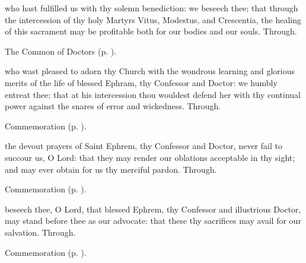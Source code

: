 
\postcommunion
{} who hast fulfilled us with thy solemn benediction: we beseech thee; that through the intercession of thy holy Martyrs Vitus, Modestus, and Crescentia, the healing of this sacrament may be profitable both for our bodies and our souls. Through.



\begin{rubric}
	The Common of Doctors (p. \pageref{CommonDoctors}).
\end{rubric}

\collect
{} who wast pleased to adorn thy Church with the wondrous learning and glorious merits of the life of blessed Ephram, thy Confessor and Doctor: we humbly entreat thee; that at his intercession thou wouldest defend her with thy continual power against the snares of error and wickedness. Through.

\begin{rubric}
	Commemoration  (p. \pageref{MarcusMarcellianusCollect}).
\end{rubric}

\secret
{} the devout prayers of Saint Ephrem, thy Confessor and Doctor, never fail to succour us, O Lord: that they may render our oblations acceptable in thy sight; and may ever obtain for us thy merciful pardon. Through.

\begin{rubric}
	Commemoration  (p. \pageref{MarcusMarcellianusSecret}).
\end{rubric}

\postcommunion
{} beseech thee, O Lord, that blessed Ephrem, thy Confessor and illustrious Doctor, may stand before thee as our advocate: that these thy sacrifices may avail for our salvation. Through.

\begin{rubric}
	Commemoration  (p. \pageref{MarcusMarcellianusPostcommunion}).
\end{rubric}



